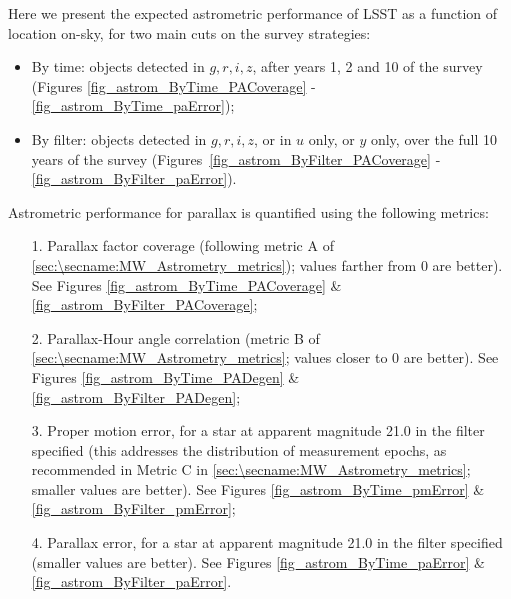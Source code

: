 Here we present the expected astrometric performance of LSST as a function of
location on-sky, for two main cuts on the survey strategies:
\begin{itemize}
  \item By time: objects detected in $g,r,i,z$, after years 1, 2 and 10
    of the survey (Figures \ref{fig_astrom_ByTime_PACoverage} -
    \ref{fig_astrom_ByTime_paError});
\item By filter: objects detected in $g,r,i,z$, or in $u$ only, or $y$ only, over the full 10 years of the survey (Figures~\ref{fig_astrom_ByFilter_PACoverage} - \ref{fig_astrom_ByFilter_paError}).
\end{itemize}

Astrometric performance for parallax is quantified using the following
metrics:
\begin{itemize}
  \item[1.] Parallax factor coverage (following metric A of \autoref{sec:\secname:MW_Astrometry_metrics}); values farther from 0 are better). See Figures \ref{fig_astrom_ByTime_PACoverage} \&  \ref{fig_astrom_ByFilter_PACoverage};
    \item[2.] Parallax-Hour angle correlation (metric B of \autoref{sec:\secname:MW_Astrometry_metrics}; values closer to 0 are better). See Figures \ref{fig_astrom_ByTime_PADegen} \& \ref{fig_astrom_ByFilter_PADegen};
      \item[3.] Proper motion error, for a star at apparent magnitude 21.0 in the filter specified (this addresses the distribution of measurement epochs, as recommended in Metric C in \autoref{sec:\secname:MW_Astrometry_metrics}; smaller values are better). See Figures \ref{fig_astrom_ByTime_pmError} \& \ref{fig_astrom_ByFilter_pmError};
        \item[4.] Parallax error, for a star at apparent magnitude 21.0 in the filter specified (smaller values are better). See Figures \ref{fig_astrom_ByTime_paError} \& \ref{fig_astrom_ByFilter_paError}.
\end{itemize}

